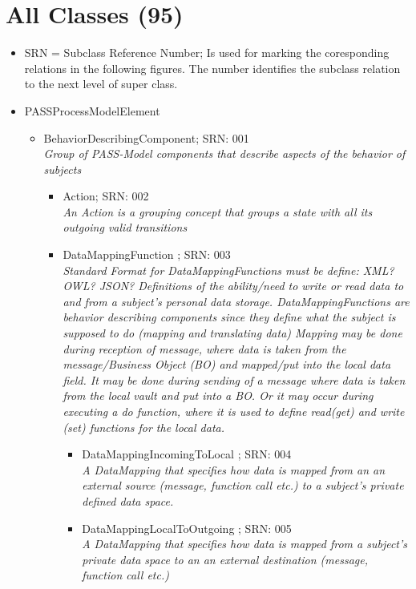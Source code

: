 \section{All Classes (95)}

\footnotesize

\begin{itemize}
	\item SRN = Subclass Reference Number; Is used for marking the coresponding relations in the following figures. The number identifies the subclass relation to the next level of super class.
	\item PASSProcessModelElement
	\begin{itemize}
		\item BehaviorDescribingComponent; SRN: 001 \\  \textit{Group of PASS-Model components that describe aspects of the behavior of subjects}
		\begin{itemize}
			\item Action; SRN: 002 \\ \textit{An Action is a grouping concept that groups a state with all its outgoing valid transitions}
			\item DataMappingFunction ; SRN: 003 \\ \textit{Standard Format for DataMappingFunctions must be define: XML? OWL? JSON? 
				Definitions of the ability/need to write or read data to and from a subject's personal data storage.
				DataMappingFunctions are behavior describing components since they define what the subject is supposed to do (mapping and translating data)
				Mapping may be done during reception of message, where data is taken from the message/Business Object (BO) and mapped/put into the local data field.
				It may be done during sending of a message where data is taken from the local vault and put into a BO.
				Or it may occur during executing a do function, where it is used to define read(get) and write (set) functions for the local data.}
			\begin{itemize}
				\item DataMappingIncomingToLocal ; SRN: 004 \\ \textit{A DataMapping that specifies how data is mapped from an an external source (message, function call etc.) to a subject's private defined data space.}
				\item DataMappingLocalToOutgoing ; SRN: 005 \\ \textit{A DataMapping that specifies how data is mapped from a subject's private data space to an an external destination (message, function call etc.)}

\end{itemize}
\end{itemize}
\end{itemize}
\end{itemize}
